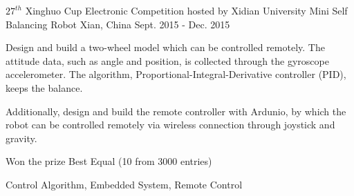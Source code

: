 \begin{cventries}
  \cventry
    {$27^{th}$ Xinghuo Cup Electronic Competition hosted by Xidian University} %
    {Mini Self Balancing Robot} %
    {Xian, China} %
    {Sept. 2015 - Dec. 2015} %
    {
      \begin{cvitems} %
        \item {Design and build a two-wheel model which can be controlled remotely. The attitude data, such as angle and position, is collected through the gyroscope accelerometer. The algorithm, Proportional-Integral-Derivative controller (PID), keeps the balance.}
       \item {Additionally, design and build the remote controller with Ardunio, by which the robot can be controlled remotely via wireless connection
       	through joystick and gravity.}
       \item {Won the prize Best Equal (10 from 3000 entries)}
      \end{cvitems}
    }{Control Algorithm,  Embedded System, Remote Control}

\end{cventries}

